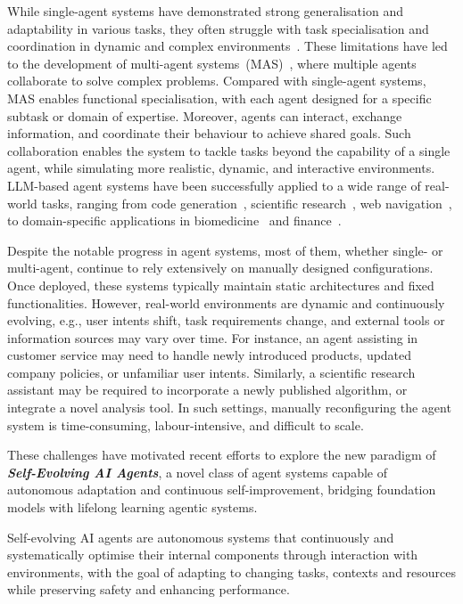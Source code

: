 \documentclass[]{selfevolagent}
\theoremstyle{plain}
\theoremstyle{definition}
\theoremstyle{remark}
\begin{document}
While single-agent systems have demonstrated strong generalisation and adaptability in various tasks, they often struggle with task specialisation and coordination in dynamic and complex environments~\citep{wu2024autogen,qian2024chatdevcommunicativeagentssoftware}. These limitations have led to the development of multi-agent systems~(MAS)~\citep{hong2023metagpt,guo2024large,zhou2025multi}, where multiple agents collaborate to solve complex problems. Compared with single-agent systems, MAS enables functional specialisation, with each agent designed for a specific subtask or domain of expertise. 
Moreover, agents can interact, exchange information, and coordinate their behaviour to achieve shared goals. Such collaboration enables the system to tackle tasks beyond the capability of a single agent, while simulating more realistic, dynamic, and interactive environments. LLM-based agent systems have been successfully applied to a wide range of real-world tasks, ranging from code generation~\citep{jiang2024survey}, scientific research~\citep{lu2024ai}, web navigation~\citep{lai2024autowebglm}, to domain-specific applications in biomedicine~\citep{kim2024mdagents} and finance~\citep{tian2025template}. 

Despite the notable progress in agent systems, most of them, whether single- or multi-agent, continue to rely extensively on manually designed configurations. Once deployed, these systems typically maintain static architectures and fixed functionalities.
However, real-world environments are dynamic and continuously evolving, e.g., user intents shift, task requirements change, and external tools or information sources may vary over time. 
For instance, an agent assisting in customer service may need to handle newly introduced products, updated company policies, or unfamiliar user intents. Similarly, a scientific research assistant may be required to incorporate a newly published algorithm, or integrate a novel analysis tool. 
In such settings, manually reconfiguring the agent system is time-consuming, labour-intensive, and difficult to scale. 

These challenges have motivated recent efforts to explore the new paradigm of \textit{\textbf{Self-Evolving AI Agents}}, a novel class of agent systems capable of autonomous adaptation and continuous self-improvement, bridging foundation models with lifelong learning agentic systems.

\vspace{0.6em}
\begin{tcolorbox}[
  colback=selfevolagent_light!20,
  colframe=selfevolagent_light!80,
  colbacktitle=selfevolagent_light!80,
  coltitle=black,
  title={\bfseries\fontfamily{ppl}\selectfont{Definition}},
  boxrule=2pt,
  arc=5pt,
  drop shadow,
  parbox=false,
  before skip=5pt,
  after skip=5pt,
  left=5pt,   
  right=5pt,
]
Self-evolving AI agents are autonomous systems that continuously and systematically optimise their internal components through interaction with environments, with the goal of adapting to changing tasks, contexts and resources while preserving safety and enhancing performance.
\end{tcolorbox}
\end{document}
